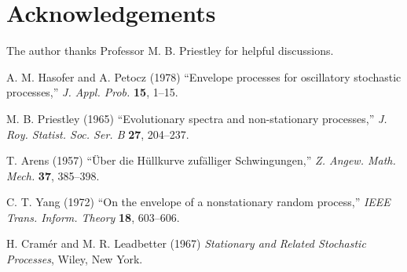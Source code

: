 \documentclass{article}
\begin{document}
\section*{Acknowledgements}

The author thanks Professor M. B. Priestley for helpful discussions.

\begin{thebibliography}{9}
A. M. Hasofer and A. Petocz (1978) ``Envelope processes for oscillatory stochastic processes,'' \textit{J. Appl. Prob.} \textbf{15}, 1--15.

M. B. Priestley (1965) ``Evolutionary spectra and non-stationary processes,'' \textit{J. Roy. Statist. Soc. Ser. B} \textbf{27}, 204--237.

T. Arens (1957) ``Über die Hüllkurve zufälliger Schwingungen,'' \textit{Z. Angew. Math. Mech.} \textbf{37}, 385--398.

C. T. Yang (1972) ``On the envelope of a nonstationary random process,'' \textit{IEEE Trans. Inform. Theory} \textbf{18}, 603--606.

H. Cramér and M. R. Leadbetter (1967) \textit{Stationary and Related Stochastic Processes}, Wiley, New York.
\end{thebibliography}
\end{document}
